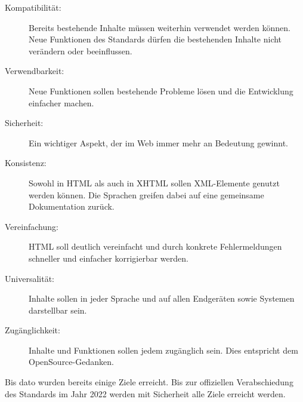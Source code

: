 \begin{description}
  \item[Kompatibilität:]
  Bereits bestehende Inhalte müssen weiterhin verwendet werden können. Neue
  Funktionen des Standards dürfen die bestehenden Inhalte nicht verändern oder
  beeinflussen.
  \item[Verwendbarkeit:]
  Neue Funktionen sollen bestehende Probleme lösen und die Entwicklung
  einfacher machen.
  \item[Sicherheit:]
  Ein wichtiger Aspekt, der im Web immer mehr an Bedeutung gewinnt.
  \item[Konsistenz:]
  Sowohl in HTML als auch in XHTML sollen XML-Elemente genutzt werden können.
  Die Sprachen greifen dabei auf eine gemeinsame Dokumentation zurück.
  \item[Vereinfachung:]
  HTML soll deutlich vereinfacht und durch konkrete Fehlermeldungen schneller
  und einfacher korrigierbar werden.
  \item[Universalität:]
  Inhalte sollen in jeder Sprache und auf allen Endgeräten sowie Systemen
  darstellbar sein.
  \item[Zugänglichkeit:]
  Inhalte und Funktionen sollen jedem zugänglich sein. Dies entspricht dem
  OpenSource-Gedanken.
\end{description}
%
Bis dato wurden bereits einige Ziele erreicht. Bis zur offiziellen
Verabschiedung des Standards im Jahr 2022 werden mit Sicherheit alle Ziele
erreicht werden.

